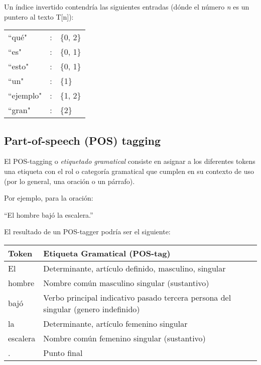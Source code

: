 Un \'indice invertido contendr\'ia las siguientes entradas (d\'onde el n\'umero \textit{n} es un puntero al texto T[n]):
\medskip %

\begin{tabular}{lll}
	``qu\'e" & : & \{0, 2\}\\
	``es" &:& \{0, 1\}\\
	``esto" & :& \{0, 1\} \\
	``un" & :&   \{1\} \\
	``ejemplo" & :& \{1, 2\} \\
	``gran" & :& \{2\} \\
\end{tabular}
\medskip



\subsection{Part-of-speech (POS) tagging}
\label{subsec:pos}
El POS-tagging o \textit{etiquetado gramatical} consiste en asignar a los diferentes 
tokens una etiqueta con el rol o categor\'ia gramatical que cumplen en su contexto de uso (por lo general, una oraci\'on o un p\'arrafo). 
\newline

Por ejemplo, para la oraci\'on:

\medskip

\begin{center}
{\textquotedblleft}El hombre baj\'o la escalera.{\textquotedblright} 
\end{center}
\medskip

El resultado de un POS-tagger podr\'ia ser el siguiente:
\newline

\begin{tabular}{| l | l |}
 \hline
Token & Etiqueta Gramatical (POS-tag) \\ \hline
El  & Determinante, art\'iculo definido, masculino, singular\\ \hline
hombre &  Nombre com\'un masculino singular (sustantivo) \\ \hline
baj\'o  & Verbo principal indicativo pasado tercera persona del singular (genero indefinido)\\ \hline
la  & Determinante, art\'iculo femenino singular \\ \hline
escalera & Nombre com\'un femenino singular (sustantivo) \\ \hline
.  & Punto final\\ \hline
\end{tabular}


